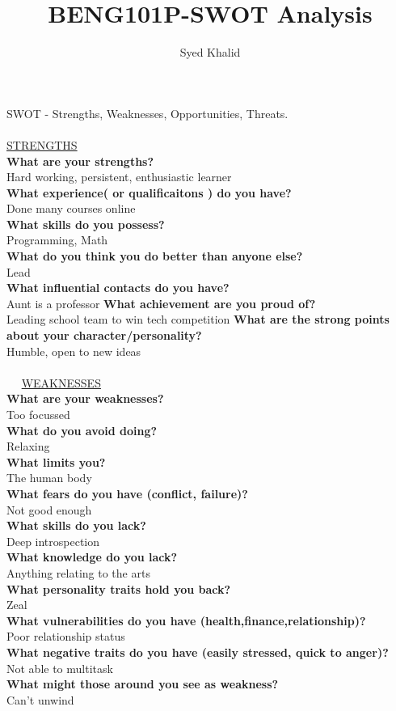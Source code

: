 \documentclass{article}
\title{\textbf{BENG101P-SWOT Analysis}}
\author{Syed Khalid}
\begin{document}
\maketitle
SWOT - Strengths, Weaknesses, Opportunities, Threats. \\
\\ 
\underline{STRENGTHS}\\
\textbf{What are your strengths?}\\
Hard working, persistent, enthusiastic learner \\
\textbf{What experience( or qualificaitons ) do you have?  }\\
Done many courses online \\ 
\textbf{What skills do you possess?}\\
Programming, Math\\
\textbf{What do you think you do better than anyone else?}\\
Lead\\ 
\textbf{What influential contacts do you have?}\\
Aunt is a professor 
\textbf{What achievement are you proud of?}\\
Leading school team to win tech competition
\textbf{What are the strong points about your character/personality?}\\
Humble, open to new ideas \\
\\
\,\,\,\,\,\,\,\,\underline{WEAKNESSES}\\
\textbf{What are your weaknesses?}\\
Too focussed \\
\textbf{What do you avoid doing?}\\
Relaxing\\
\textbf{What limits you?}\\
The human body\\
\textbf{What fears do you have (conflict, failure)?}\\
Not good enough\\
\textbf{What skills do you lack?}\\
Deep introspection\\
\textbf{What knowledge do you lack?}\\
Anything relating to the arts\\
\textbf{What personality traits hold you back?}\\
Zeal\\
\textbf{What vulnerabilities do you have (health,finance,relationship)?}\\
Poor relationship status\\
\textbf{What negative traits do you have (easily stressed, quick to anger)?}\\
Not able to multitask\\
\textbf{What might those around you see as weakness?}\\
Can't unwind \\
\\ 
\end{document}

